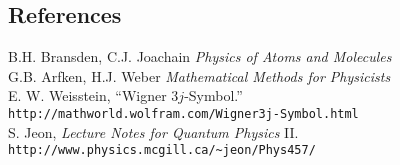 \documentclass[10.5pt,letterpaper]{article}
\begin{document}
\subsection*{References}


B.H. Bransden, C.J. Joachain \textit{Physics of Atoms and Molecules}\\
G.B. Arfken, H.J. Weber \textit{Mathematical Methods for Physicists}\\
E. W. Weisstein, ``Wigner 3$j$-Symbol.'' \verb|http://mathworld.wolfram.com/Wigner3j-Symbol.html|\\
S. Jeon, \textit{Lecture Notes for Quantum Physics} II. \verb|http://www.physics.mcgill.ca/~jeon/Phys457/|
\end{document}
